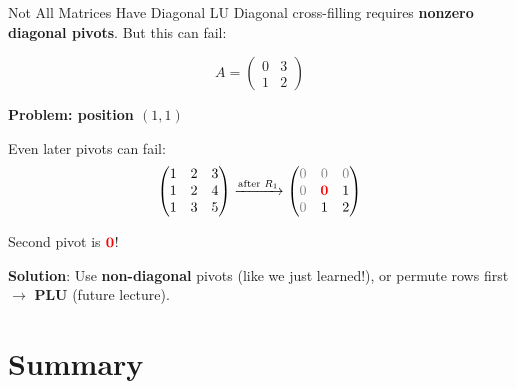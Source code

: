 \documentclass[10pt]{beamer}
\theoremstyle{definition}
\newcommand{\pvt}[1]{{\color{red}\mathbf{#1}}}       %
\newcommand{\rem}[1]{{\color{gray}#1}}                %
\newcommand{\x}[1]{\alert{\textbf{#1}}}
\begin{document}
\begin{frame}[fragile]{Not All Matrices Have Diagonal LU}
Diagonal cross-filling requires \x{nonzero diagonal pivots}. But this can fail:

$$A = \begin{pmatrix} 0 & 3 \\ 1 & 2 \end{pmatrix}$$

\textbf{Problem: position $(1,1)$}

\begin{center}
\end{center}

Even later pivots can fail:
$$\begin{pmatrix} 1 & 2 & 3 \\ 1 & 2 & 4 \\ 1 & 3 & 5 \end{pmatrix}
\xrightarrow{\text{after } R_1} \begin{pmatrix}
\rem{0} & \rem{0} & \rem{0} \\
\rem{0} & \pvt{0} & 1 \\
\rem{0} & 1 & 2
\end{pmatrix}$$

Second pivot is $\pvt{0}$!

\vspace{0.2cm}
\textbf{Solution}: Use \x{non-diagonal} pivots (like we just learned!), or permute rows first $\to$ \x{PLU} (future lecture).
\end{frame}

\section{Summary}
\end{document}
